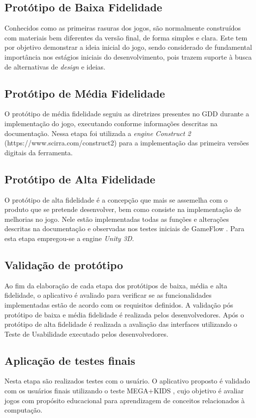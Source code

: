 \documentclass[12pt]{article}
\begin{document}
	\subsection{Protótipo de Baixa Fidelidade}
		Conhecidos como as primeiras rasuras dos jogos, são normalmente construídos com materiais bem diferentes da versão final, de forma simples e clara. Este tem por objetivo demonstrar a ideia inicial do jogo, sendo considerado de fundamental importância nos estágios iniciais do desenvolvimento, pois trazem suporte à busca de alternativas de \textit{design} e ideias.
	
	\subsection{Protótipo de Média Fidelidade}
		O protótipo de média fidelidade seguiu as diretrizes presentes no GDD durante a implementação do jogo, executando conforme informações descritas na documentação. Nessa etapa foi utilizada a \textit{engine Construct 2} (https://www.scirra.com/construct2) para a implementação das primeira versões digitais da ferramenta.
	
	\subsection{Protótipo de Alta Fidelidade}
		O protótipo de alta fidelidade é a concepção que mais se assemelha com o produto que se pretende desenvolver, bem como consiste na implementação de melhorias no jogo. Nele estão implementadas todas as funções e alterações descritas na documentação e observadas nos testes iniciais de GameFlow \cite{rogers2014level}. Para esta etapa empregou-se a engine \textit{Unity 3D}.
	
	\subsection{Validação de protótipo}
		Ao fim da elaboração de cada etapa dos protótipos de baixa, média e alta fidelidade, o aplicativo é avaliado para verificar se as funcionalidades implementadas estão de acordo com os requisitos definidos. A validação pós protótipo de baixa e média fidelidade é realizada pelos desenvolvedores. Após o protótipo de alta fidelidade é realizada a avaliação das interfaces utilizando o Teste de Usabilidade 	\cite{nielsen1994usability} executado pelos desenvolvedores. 
		
	\subsection{Aplicação de testes finais}
		Nesta etapa são realizados testes com o usuário. O aplicativo proposto é validado com os usuários finais utilizando o teste MEGA+KIDS \cite{von2018meega+}, cujo objetivo é avaliar jogos com propósito educacional para aprendizagem de conceitos relacionados à computação.
		
\end{document}
